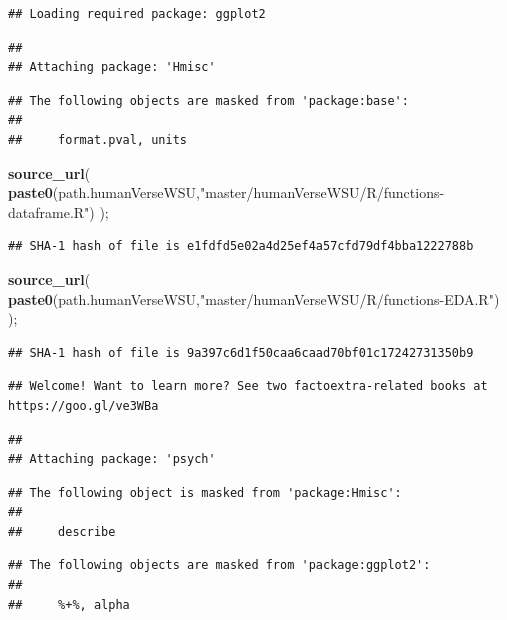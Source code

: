 \documentclass[]{article}
\newenvironment{Shaded}{\begin{snugshade}}{\end{snugshade}}
\newcommand{\KeywordTok}[1]{\textcolor[rgb]{0.13,0.29,0.53}{\textbf{#1}}}
\newcommand{\NormalTok}[1]{#1}
\newcommand{\StringTok}[1]{\textcolor[rgb]{0.31,0.60,0.02}{#1}}
\begin{document}
\begin{verbatim}
## Loading required package: ggplot2
\end{verbatim}

\begin{verbatim}
## 
## Attaching package: 'Hmisc'
\end{verbatim}

\begin{verbatim}
## The following objects are masked from 'package:base':
## 
##     format.pval, units
\end{verbatim}

\begin{Shaded}
\begin{Highlighting}[]
\KeywordTok{source\_url}\NormalTok{( }\KeywordTok{paste0}\NormalTok{(path.humanVerseWSU,}\StringTok{"master/humanVerseWSU/R/functions{-}dataframe.R"}\NormalTok{) );}
\end{Highlighting}
\end{Shaded}

\begin{verbatim}
## SHA-1 hash of file is e1fdfd5e02a4d25ef4a57cfd79df4bba1222788b
\end{verbatim}

\begin{Shaded}
\begin{Highlighting}[]
\KeywordTok{source\_url}\NormalTok{( }\KeywordTok{paste0}\NormalTok{(path.humanVerseWSU,}\StringTok{"master/humanVerseWSU/R/functions{-}EDA.R"}\NormalTok{) );}
\end{Highlighting}
\end{Shaded}

\begin{verbatim}
## SHA-1 hash of file is 9a397c6d1f50caa6caad70bf01c17242731350b9
\end{verbatim}

\begin{verbatim}
## Welcome! Want to learn more? See two factoextra-related books at https://goo.gl/ve3WBa
\end{verbatim}

\begin{verbatim}
## 
## Attaching package: 'psych'
\end{verbatim}

\begin{verbatim}
## The following object is masked from 'package:Hmisc':
## 
##     describe
\end{verbatim}

\begin{verbatim}
## The following objects are masked from 'package:ggplot2':
## 
##     %+%, alpha
\end{verbatim}
\end{document}
